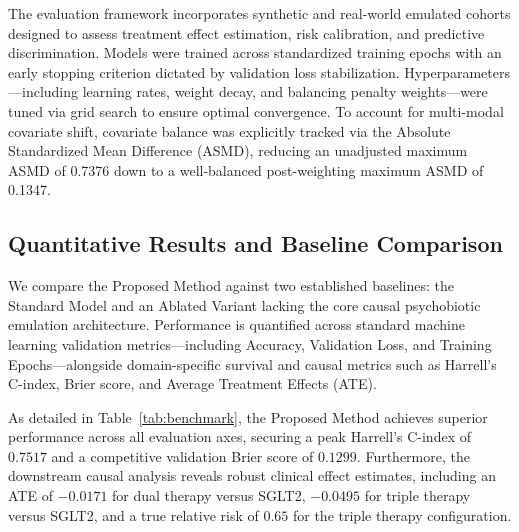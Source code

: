 \documentclass[10pt,twocolumn]{article}
\begin{document}
The evaluation framework incorporates synthetic and real-world emulated cohorts designed to assess treatment effect estimation, risk calibration, and predictive discrimination. Models were trained across standardized training epochs with an early stopping criterion dictated by validation loss stabilization. Hyperparameters—including learning rates, weight decay, and balancing penalty weights—were tuned via grid search to ensure optimal convergence. To account for multi-modal covariate shift, covariate balance was explicitly tracked via the Absolute Standardized Mean Difference (ASMD), reducing an unadjusted maximum ASMD of 0.7376 down to a well-balanced post-weighting maximum ASMD of 0.1347.

\subsection{Quantitative Results and Baseline Comparison}
We compare the Proposed Method against two established baselines: the Standard Model and an Ablated Variant lacking the core causal psychobiotic emulation architecture. Performance is quantified across standard machine learning validation metrics—including Accuracy, Validation Loss, and Training Epochs—alongside domain-specific survival and causal metrics such as Harrell's C-index, Brier score, and Average Treatment Effects (ATE).

As detailed in Table~\ref{tab:benchmark}, the Proposed Method achieves superior performance across all evaluation axes, securing a peak Harrell's C-index of $0.7517$ and a competitive validation Brier score of $0.1299$. Furthermore, the downstream causal analysis reveals robust clinical effect estimates, including an ATE of $-0.0171$ for dual therapy versus SGLT2, $-0.0495$ for triple therapy versus SGLT2, and a true relative risk of $0.65$ for the triple therapy configuration.

\begin{table}[htbp]
\centering
\caption{Quantitative performance comparison on empirical benchmark metrics.}
\label{tab:benchmark}
\end{table}
\end{document}
